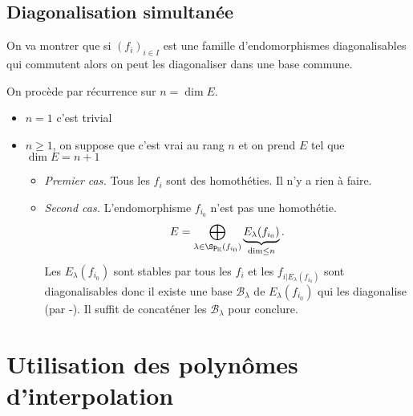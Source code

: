 \subsection{Diagonalisation simultanée}

On va montrer que si $(f_i)_{i\in I}$ est une famille d'endomorphismes diagonalisables qui commutent alors on peut les diagonaliser dans une base commune.

On procède par récurrence sur $n=\dim E$.
\begin{itemize}
    \item $n=1$ c'est trivial
    \item $n\geq 1$, on suppose que c'est vrai au rang $n$ et on prend $E$ tel que $\dim E=n+1$ \begin{itemize}
        \item \emph{Premier cas.} Tous les $f_i$ sont des homothéties. Il n'y a rien à faire.
        \item \emph{Second cas.} L'endomorphisme $f_{i_0}$ n'est pas une homothétie. \[
                E=\bigoplus_{\lambda\in\Sp_{\mathbb K}(f_{i_0})} \underbrace{E_\lambda(f_{i_0})}_{\dim \leq n}.
            \]
            Les $E_\lambda(f_{i_0})$ sont stables par tous les $f_i$ et les $f_{i|E_\lambda(f_{i_0})}$ sont diagonalisables donc il existe une base $\mathcal B_\lambda$ de $E_\lambda(f_{i_0})$ qui les diagonalise (par \hyp). Il suffit de concaténer les $\mathcal B_\lambda$ pour conclure.
    \end{itemize}
\end{itemize}

\section{Utilisation des polynômes d'interpolation}

